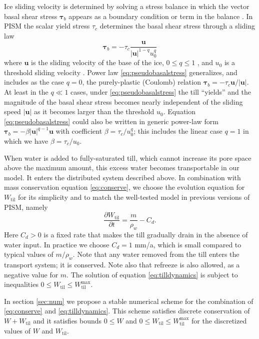 \documentclass[gmd]{copernicus}   %
\newcommand{\text}{\textrm}
\newcommand{\Wtil}{W_{\text{til}}}
\newcommand{\Wtilmax}{W_{\text{til}}^{\text{max}}}
\begin{document}
Ice sliding velocity is determined by solving a stress balance in which the vector basal shear stress $\boldsymbol\tau_b$ appears as a boundary condition or term in the balance \citep{SchoofStream,SchoofCoulombBlatter,BBssasliding}.  In PISM the scalar yield stress $\tau_c$ determines the basal shear stress through a sliding law
\begin{equation}
\boldsymbol\tau_b = - \tau_c \frac{\mathbf{u}}{|\mathbf{u}|^{1-q} u_0^q} \label{eq:pseudobasalstress}
\end{equation}
where $\mathbf{u}$ is the sliding velocity of the base of the ice, $0\le q \le 1$ , and $u_0$ is a threshold sliding velocity \citep{AschwandenAdalgeirsdottirKhroulev}.  Power law \eqref{eq:pseudobasalstress} generalizes, and includes as the case $q=0$, the purely-plastic (Coulomb) relation $\boldsymbol\tau_b = - \tau_c \mathbf{u}/|\mathbf{u}|$.  At least in the $q\ll 1$ cases, under \eqref{eq:pseudobasalstress} the till ``yields'' and the magnitude of the basal shear stress becomes nearly independent of the sliding speed $|\mathbf{u}|$ as it becomes larger than the threshold $u_0$.  Equation \eqref{eq:pseudobasalstress} could also be written in generic power-law form $\boldsymbol\tau_b = - \beta |\mathbf{u}|^{q-1} \mathbf{u}$ with coefficient $\beta = \tau_c / u_0^q$; this includes the linear case $q=1$ in which we have $\beta = \tau_c/u_0$.

When water is added to fully-saturated till, which cannot increase its pore space above the maximum amount, this excess water becomes transportable in our model.  It enters the distributed system described above.  In combination with mass conservation equation \eqref{eq:conserve}, we choose the evolution equation for $\Wtil$ for  its simplicity and to match the well-tested model in previous versions of PISM, namely
\begin{equation}
\frac{\partial \Wtil}{\partial t} = \frac{m}{\rho_w} - C_d. \label{eq:tilldynamics}
\end{equation}
Here $C_d>0$ is a fixed rate that makes the till gradually drain in the absence of water input.  In practice we choose $C_d=1$ mm/a, which is small compared to typical values of $m/\rho_w$.  Note that any water removed from the till enters the transport system; it is conserved.  Note also that refreeze is also allowed, as a negative value for $m$.  The solution of equation \eqref{eq:tilldynamics} is subject to inequalities $0\le \Wtil \le \Wtilmax$.

In section \ref{sec:num} we propose a stable numerical scheme for the combination of \eqref{eq:conserve} and \eqref{eq:tilldynamics}.  This scheme satisfies discrete conservation of $W+\Wtil$ and it satisfies bounds $0\le W$ and $0\le \Wtil \le \Wtilmax$ for the discretized values of $W$ and $\Wtil$.
\end{document}

